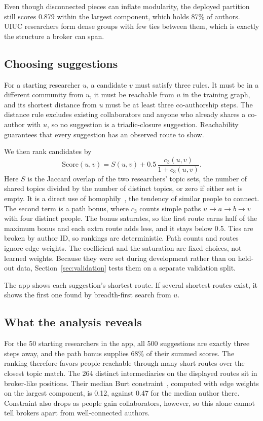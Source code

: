 \documentclass[sigconf,nonacm]{acmart}
\begin{document}
Even though disconnected pieces can inflate modularity, the deployed partition still scores 0.879 within the largest component, which holds 87\% of authors. UIUC researchers form dense groups with few ties between them, which is exactly the structure a broker can span.

\subsection{Choosing suggestions}\label{sec:method}
For a starting researcher $u$, a candidate $v$ must satisfy three rules. It must be in a different community from $u$, it must be reachable from $u$ in the training graph, and its shortest distance from $u$ must be at least three co-authorship steps. The distance rule excludes existing collaborators and anyone who already shares a co-author with $u$, so no suggestion is a triadic-closure suggestion. Reachability guarantees that every suggestion has an observed route to show.

We then rank candidates by
\begin{equation}
\mathrm{Score}(u,v)=S(u,v)+0.5\,\frac{c_3(u,v)}{1+c_3(u,v)}.
\label{eq:score}
\end{equation}
Here $S$ is the Jaccard overlap of the two researchers' topic sets, the number of shared topics divided by the number of distinct topics, or zero if either set is empty. It is a direct use of homophily~\cite{easley2010}, the tendency of similar people to connect. The second term is a path bonus, where $c_3$ counts simple paths $u\to a\to b\to v$ with four distinct people. The bonus saturates, so the first route earns half of the maximum bonus and each extra route adds less, and it stays below 0.5. Ties are broken by author ID, so rankings are deterministic. Path counts and routes ignore edge weights. The coefficient and the saturation are fixed choices, not learned weights. Because they were set during development rather than on held-out data, Section~\ref{sec:validation} tests them on a separate validation split.

The app shows each suggestion's shortest route. If several shortest routes exist, it shows the first one found by breadth-first search from $u$.

\subsection{What the analysis reveals}
For the 50 starting researchers in the app, all 500 suggestions are exactly three steps away, and the path bonus supplies 68\% of their summed scores. The ranking therefore favors people reachable through many short routes over the closest topic match. The 264 distinct intermediaries on the displayed routes sit in broker-like positions. Their median Burt constraint~\cite{burt1992}, computed with edge weights on the largest component, is 0.12, against 0.47 for the median author there. Constraint also drops as people gain collaborators, however, so this alone cannot tell brokers apart from well-connected authors.
\end{document}
